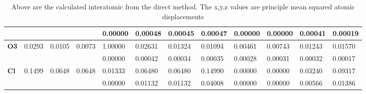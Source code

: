 \documentclass[]{scrartcl}
\begin{document}
\begin{table}[]
\begin{tabular}{|l|l|l|l|l|l|l|l|l|l|l|l|}
		\textbf{}                           &                                 &                                 &                                 & 0.00000                           & 0.00048                           & 0.00045                           & 0.00047                           & 0.00000                           & 0.00000                           & 0.00041                           & 0.00019                           \\ \hline
		\textbf{O3}                         & 0.0293                          & 0.0105                          & 0.0073                          & 1.00000                           & 0.02631                           & 0.01324                           & 0.01094                           & 0.00461                           & 0.00743                           & 0.01243                           & 0.01570                           \\ \hline
		\textbf{}                           &                                 &                                 &                                 & 0.00000                           & 0.00042                           & 0.00034                           & 0.00035                           & 0.00028                           & 0.00031                           & 0.00032                           & 0.00017                           \\ \hline
		\textbf{Cl}                         & 0.1499                          & 0.0648                          & 0.0648                          & 0.01333                           & 0.06480                           & 0.06480                           & 0.14990                           & 0.00000                           & 0.00000                           & 0.03240                           & 0.09317                           \\ \hline
		&                                 &                                 &                                 & 0.00000                           & 0.01132                           & 0.01132                           & 0.04008                           & 0.00000                           & 0.00000                           & 0.00566                           & 0.01386                           \\ \hline
	\end{tabular}
	\caption{Above are the calculated interatomic from the direct method. The x,y,z values are principle mean squared atomic displacements}
\end{table}
\end{document}

